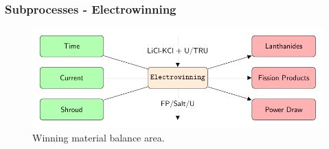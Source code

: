 \begin{frame}
\frametitle{Subprocesses - Electrowinning}
		\begin{figure} 
			\centering
			\includegraphics[width=0.8\linewidth]{winning}
			\caption{Winning material balance area.}
			\label{fig:winning}
		\end{figure}
\end{frame}